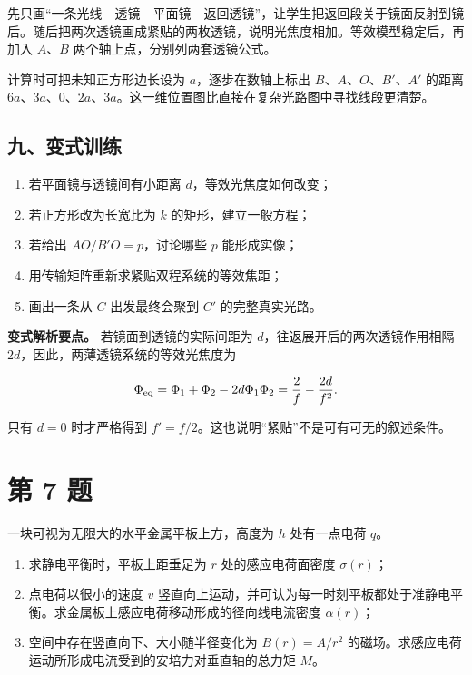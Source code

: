 \documentclass[12pt,a4paper,UTF8]{ctexart}
\newcommand{\tightlist}{\setlength{\itemsep}{0pt}\setlength{\parskip}{0pt}}
\begin{document}
先只画``一条光线---透镜---平面镜---返回透镜''，让学生把返回段关于镜面反射到镜后。随后把两次透镜画成紧贴的两枚透镜，说明光焦度相加。等效模型稳定后，再加入
\(A\)、\(B\) 两个轴上点，分别列两套透镜公式。

计算时可把未知正方形边长设为 \(a\)，逐步在数轴上标出
\(B\)、\(A\)、\(O\)、\(B'\)、\(A'\) 的距离
\(6a\)、\(3a\)、\(0\)、\(2a\)、\(3a\)。这一维位置图比直接在复杂光路图中寻找线段更清楚。

\subsection{九、变式训练}\label{ux4e5dux53d8ux5f0fux8badux7ec3-5}

\begin{enumerate}
\def\labelenumi{\arabic{enumi}.}
\tightlist
\item
  若平面镜与透镜间有小距离 \(d\)，等效光焦度如何改变；
\item
  若正方形改为长宽比为 \(k\) 的矩形，建立一般方程；
\item
  若给出 \(AO/B'O=p\)，讨论哪些 \(p\) 能形成实像；
\item
  用传输矩阵重新求紧贴双程系统的等效焦距；
\item
  画出一条从 \(C\) 出发最终会聚到 \(C'\) 的完整真实光路。
\end{enumerate}

\textbf{变式解析要点。} 若镜面到透镜的实际间距为
\(d\)，往返展开后的两次透镜作用相隔
\(2d\)，因此，两薄透镜系统的等效光焦度为

\[
\Phi_{\rm eq}=\Phi_1+\Phi_2-2d\Phi_1\Phi_2
=\frac2f-\frac {2d}{f^2}.
\]

只有 \(d=0\) 时才严格得到
\(f'=f/2\)。这也说明``紧贴''不是可有可无的叙述条件。

\newpage

\section{第 7 题}\label{ux7b2c-7-ux9898}

一块可视为无限大的水平金属平板上方，高度为 \(h\) 处有一点电荷 \(q\)。

\begin{enumerate}
\def\labelenumi{\arabic{enumi}.}
\tightlist
\item
  求静电平衡时，平板上距垂足为 \(r\) 处的感应电荷面密度 \(\sigma(r)\)；
\item
  点电荷以很小的速度 \(v\)
  竖直向上运动，并可认为每一时刻平板都处于准静电平衡。求金属板上感应电荷移动形成的径向线电流密度
  \(\alpha(r)\)；
\item
  空间中存在竖直向下、大小随半径变化为 \(B(r)=A/r^2\)
  的磁场。求感应电荷运动所形成电流受到的安培力对垂直轴的总力矩 \(M\)。
\end{enumerate}
\end{document}
